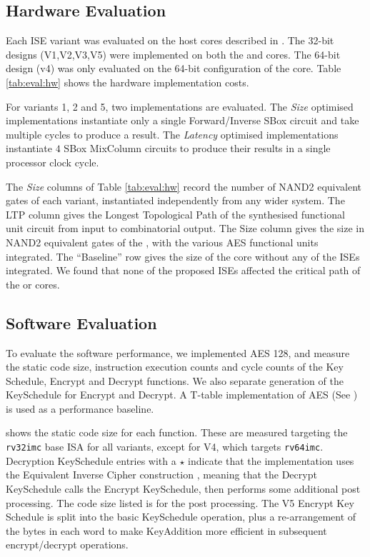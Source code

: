 
\subsection{Hardware Evaluation}
\label{sec:eval:sw}

Each ISE variant was evaluated on the host cores
described in .
The 32-bit designs (V1,V2,V3,V5) were implemented on both the
 and  cores.
The 64-bit design (v4) was only evaluated on the 64-bit configuration
of the  core.
Table \ref{tab:eval:hw} shows the hardware implementation costs.

For variants 1, 2 and 5, two implementations are evaluated.
The {\em Size} optimised implementations instantiate only a single
Forward/Inverse SBox circuit and take multiple cycles
to produce a result.
The {\em Latency} optimised implementations instantiate $4$ SBox
MixColumn circuits to produce their results in a single processor 
clock cycle.

The {\em Size} columns of Table \ref{tab:eval:hw} 
record the number of NAND2 equivalent gates of each variant,
instantiated independently from any wider system.
The LTP column gives the Longest Topological Path of the synthesised
functional unit circuit from input to combinatorial output.
The  Size column gives the size in NAND2 equivalent gates of the
, with the various AES functional units integrated.
The ``Baseline'' row gives the size of the core without any of the
ISEs integrated.
We found that none of the proposed ISEs affected the critical
path of the  or  cores.



\subsection{Software Evaluation}
\label{sec:eval:sw}

To evaluate the software performance, we implemented AES 128, and
measure the static code size, instruction execution counts and cycle
counts of the Key Schedule, Encrypt and Decrypt functions.
We also separate generation of the KeySchedule for Encrypt and Decrypt.
A T-table implementation of AES (See )
is used as a performance baseline.

 shows the static code size for each
function.
These are measured targeting the {\tt rv32imc} base ISA for all variants,
except for V4, which targets {\tt rv64imc}.
Decryption KeySchedule entries with a $\star$ indicate that the
implementation uses the Equivalent Inverse Cipher construction
\cite[Section 5.3.5, Page 23]{FIPS:197}, meaning that the
Decrypt KeySchedule calls the Encrypt KeySchedule, then performs some
additional post processing. The code size listed is for the post processing.
The V5 Encrypt Key Schedule is split into the basic KeySchedule
operation, plus a re-arrangement of the bytes in each word to make
KeyAddition more efficient in subsequent encrypt/decrypt operations.

